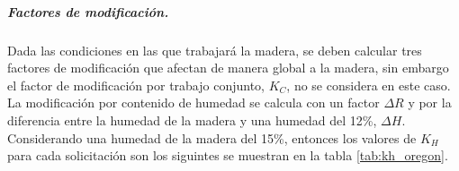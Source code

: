 \subparagraph{Factores de modificación.}
Dada las condiciones en las que trabajará la madera, se deben calcular tres factores de modificación que afectan de manera global a la madera, sin embargo el factor de modificación por trabajo conjunto, $K_C$, no se considera en este caso. La modificación por contenido de humedad se calcula con un factor $\Delta R$ y por la diferencia entre la humedad de la madera y una humedad del 12\%, $\Delta H$. Considerando una humedad de la madera del 15\%, entonces los valores de $K_H$ para cada solicitación son los siguintes se muestran en la tabla \ref{tab:kh_oregon}.
\begin{table}[h]
\centering
{}
\caption{Valores del factor de modificación para el pino oregón.}
\label{tab:kh_oregon}
\end{table}

